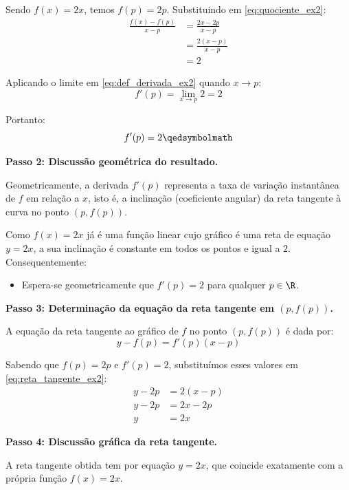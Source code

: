 Sendo $f(x) = 2x$, temos $f(p) = 2p$. Substituindo em \eqref{eq:quociente_ex2}:
\begin{align*}
    \frac{f(x) - f(p)}{x - p} &= \frac{2x - 2p}{x - p} \\[0.25cm]
    &= \frac{2(x - p)}{x - p} \\[0.25cm]
    &= 2
\end{align*}

Aplicando o limite em \eqref{eq:def_derivada_ex2} quando $x \to p$:
\[
f'(p) = \lim_{x \to p} 2 = 2
\]

Portanto:
\[
f'(p) = 2 \qedsymbolmath
\]

\vspace{0.3cm}
\textbf{Passo 2: Discussão geométrica do resultado.}

Geometricamente, a derivada $f'(p)$ representa a taxa de variação instantânea de $f$ em relação a $x$, isto é, a inclinação (coeficiente angular) da reta tangente à curva no ponto $(p, f(p))$.

Como $f(x) = 2x$ já é uma função linear cujo gráfico é uma reta de equação $y = 2x$, a sua inclinação é constante em todos os pontos e igual a $2$. Consequentemente:
\begin{itemize}[noitemsep, topsep=2pt]
    \item Espera-se geometricamente que $f'(p) = 2$ para qualquer $p \in \R$.
\end{itemize}

\vspace{0.3cm}
\textbf{Passo 3: Determinação da equação da reta tangente em $(p, f(p))$.}

A equação da reta tangente ao gráfico de $f$ no ponto $(p, f(p))$ é dada por:
\begin{equation}
    y - f(p) = f'(p)(x - p) \label{eq:reta_tangente_ex2}
\end{equation}

Sabendo que $f(p) = 2p$ e $f'(p) = 2$, substituímos esses valores em \eqref{eq:reta_tangente_ex2}:
\begin{align*}
    y - 2p &= 2(x - p) \\[0.25cm]
    y - 2p &= 2x - 2p \\[0.25cm]
    y &= 2x
\end{align*}

\vspace{0.3cm}
\textbf{Passo 4: Discussão gráfica da reta tangente.}

A reta tangente obtida tem por equação $y = 2x$, que coincide exatamente com a própria função $f(x) = 2x$.

